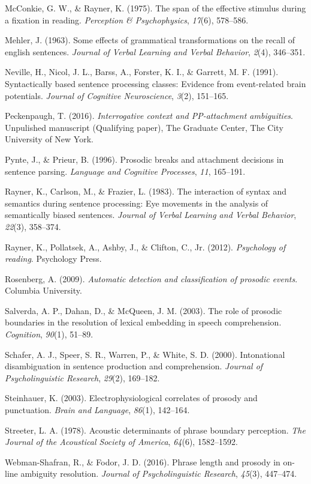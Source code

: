 \documentclass[11pt,oneside]{book}
\begin{document}
\leavevmode\hypertarget{ref-spanmcr}{}%
McConkie, G. W., \& Rayner, K. (1975). The span of the effective stimulus during a fixation in reading. \emph{Perception \& Psychophysics}, \emph{17}(6), 578--586.

\leavevmode\hypertarget{ref-mehler1963some}{}%
Mehler, J. (1963). Some effects of grammatical transformations on the recall of english sentences. \emph{Journal of Verbal Learning and Verbal Behavior}, \emph{2}(4), 346--351.

\leavevmode\hypertarget{ref-p600}{}%
Neville, H., Nicol, J. L., Barss, A., Forster, K. I., \& Garrett, M. F. (1991). Syntactically based sentence processing classes: Evidence from event-related brain potentials. \emph{Journal of Cognitive Neuroscience}, \emph{3}(2), 151--165.

\leavevmode\hypertarget{ref-qp2}{}%
Peckenpaugh, T. (2016). \emph{Interrogative context and PP-attachment ambiguities}. Unpulished manuscript (Qualifying paper), The Graduate Center, The City University of New York.

\leavevmode\hypertarget{ref-pynte1996prosodic}{}%
Pynte, J., \& Prieur, B. (1996). Prosodic breaks and attachment decisions in sentence parsing. \emph{Language and Cognitive Processes}, \emph{11}, 165--191.

\leavevmode\hypertarget{ref-raynerEtAl1983}{}%
Rayner, K., Carlson, M., \& Frazier, L. (1983). The interaction of syntax and semantics during sentence processing: Eye movements in the analysis of semantically biased sentences. \emph{Journal of Verbal Learning and Verbal Behavior}, \emph{22}(3), 358--374.

\leavevmode\hypertarget{ref-rayner2012psychology}{}%
Rayner, K., Pollatsek, A., Ashby, J., \& Clifton, C., Jr. (2012). \emph{Psychology of reading}. Psychology Press.

\leavevmode\hypertarget{ref-andrew}{}%
Rosenberg, A. (2009). \emph{Automatic detection and classification of prosodic events}. Columbia University.

\leavevmode\hypertarget{ref-salverda2003role}{}%
Salverda, A. P., Dahan, D., \& McQueen, J. M. (2003). The role of prosodic boundaries in the resolution of lexical embedding in speech comprehension. \emph{Cognition}, \emph{90}(1), 51--89.

\leavevmode\hypertarget{ref-schafer2000intonational}{}%
Schafer, A. J., Speer, S. R., Warren, P., \& White, S. D. (2000). Intonational disambiguation in sentence production and comprehension. \emph{Journal of Psycholinguistic Research}, \emph{29}(2), 169--182.

\leavevmode\hypertarget{ref-p600addscps}{}%
Steinhauer, K. (2003). Electrophysiological correlates of prosody and punctuation. \emph{Brain and Language}, \emph{86}(1), 142--164.

\leavevmode\hypertarget{ref-streeter1978acoustic}{}%
Streeter, L. A. (1978). Acoustic determinants of phrase boundary perception. \emph{The Journal of the Acoustical Society of America}, \emph{64}(6), 1582--1592.

\leavevmode\hypertarget{ref-webman2016phrase}{}%
Webman-Shafran, R., \& Fodor, J. D. (2016). Phrase length and prosody in on-line ambiguity resolution. \emph{Journal of Psycholinguistic Research}, \emph{45}(3), 447--474.
\end{document}

